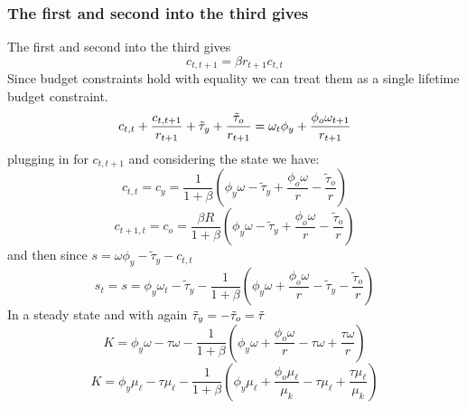 \documentclass[aspectratio=169]{ltx-talk}
\begin{document}
\begin{frame}
\frametitle{The first and second into the third gives}
The first and second into the third gives%
\begin{equation*}
c_{t,t+1}=\beta r_{t+1}c_{t,t}
\end{equation*}%
Since budget constraints hold with equality we can treat them as a single
lifetime budget constraint.%
\begin{equation*}
c_{t,t}+\frac{c_{t,t+1}}{r_{t+1}}+\tilde{\tau}_{y}+\frac{\tilde{\tau}_{o}}{%
r_{t+1}}=\omega _{t}\phi _{y}+\frac{\phi _{o}\omega _{t+1}}{r_{t+1}}
\end{equation*}%
plugging in for $c_{t,t+1}$ and considering the state we have: 
\begin{equation*}
c_{t,t}=c_{y}=\frac{1}{1+\beta }\left( \phi _{y}\omega -\tilde{\tau}_{y}+%
\frac{\phi _{o}\omega }{r}-\frac{\tilde{\tau}_{o}}{r}\right)
\end{equation*}%
\begin{equation*}
c_{t+1,t}=c_{o}=\frac{\beta R}{1+\beta }\left( \phi _{y}\omega -\tilde{\tau}%
_{y}+\frac{\phi _{o}\omega }{r}-\frac{\tilde{\tau}_{o}}{r}\right)
\end{equation*}%
and then since $s=\omega \phi _{y}-\tilde{\tau}_{y}-c_{t,t}$ 
\begin{equation*}
s_{t}=s=\phi _{y}\omega _{t}-\tilde{\tau}_{y}-\frac{1}{1+\beta }\left( \phi
_{y}\omega +\frac{\phi _{o}\omega }{r}-\tilde{\tau}_{y}-\frac{\tilde{\tau}%
_{o}}{r}\right)
\end{equation*}%
In a steady state and with again $\tilde{\tau}_{y}=-\tilde{\tau}_{o}=\tilde{%
\tau}$ 
\begin{equation*}
K=\phi _{y}\omega -\tau \omega -\frac{1}{1+\beta }\left( \phi _{y}\omega +%
\frac{\phi _{o}\omega }{r}-\tau \omega +\frac{\tau \omega }{r}\right)
\end{equation*}%
\begin{equation*}
K=\phi _{y}\mu _{\ell }-\tau \mu _{\ell }-\frac{1}{1+\beta }\left( \phi
_{y}\mu _{\ell }+\frac{\phi _{o}\mu _{\ell }}{\mu _{k}}-\tau \mu _{\ell }+%
\frac{\tau \mu _{\ell }}{\mu _{k}}\right)
\end{equation*}%
\end{frame}
\end{document}
